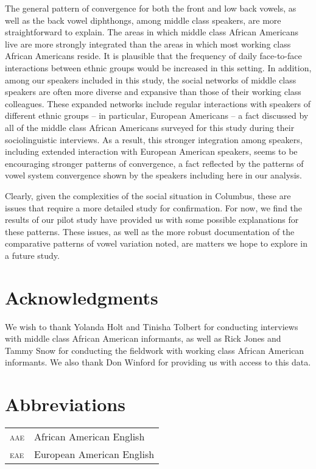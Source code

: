 \documentclass[output=paper,colorlinks,citecolor=brown]{langscibook}
\begin{document}
The general pattern of convergence for both the front and low back vowels, as well as the back vowel diphthongs, among middle class speakers, are more straightforward to explain. The areas in which middle class African Americans live are more strongly integrated than the areas in which most working class African Americans reside. It is plausible that the frequency of daily face-to-face interactions between ethnic groups would be increased in this setting. In addition, among our speakers included in this study, the social networks of middle class speakers are often more diverse and expansive than those of their working class colleagues. These expanded networks include regular interactions with speakers of different ethnic groups -- in particular, European Americans -- a fact discussed by all of the middle class African Americans surveyed for this study during their sociolinguistic interviews. As a result, this stronger integration among speakers, including extended interaction with European American speakers, seems to be encouraging stronger patterns of convergence, a fact reflected by the patterns of vowel system convergence shown by the speakers including here in our analysis.

Clearly, given the complexities of the social situation in Columbus, these are issues that require a more detailed study for confirmation. For now, we find the results of our pilot study have provided us with some possible explanations for these patterns. These issues, as well as the more robust documentation of the comparative patterns of vowel variation noted, are matters we hope to explore in a future study.

\section*{Acknowledgments}
We wish to thank Yolanda Holt and Tinisha Tolbert for conducting interviews with middle class African American informants, as well as Rick Jones and Tammy Snow for conducting the fieldwork with working class African American informants. We also thank Don Winford for providing us with access to this data.

\section*{Abbreviations}
\begin{tabularx}{.5\textwidth}{@{}lQ}

\textsc{aae} & African American English  \\
\textsc{eae} & European American English \\
\end{tabularx}

\printbibliography[heading=subbibliography,notkeyword=this]
\end{document}
